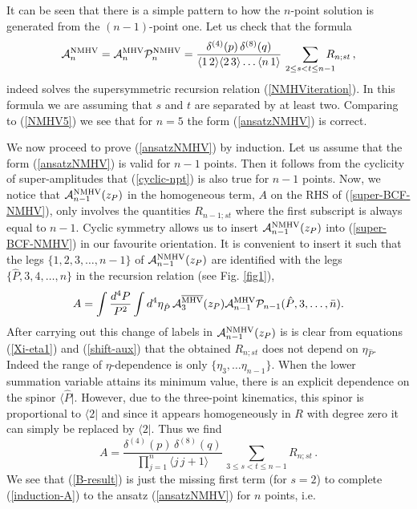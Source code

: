 \documentclass[12pt]{article}
\def \be  {\begin{equation}}
\def \ee  {\end{equation}}
\newcommand \widebar [1] {\overline{#1}}
\newcommand \vev [1] {\langle{#1}\rangle}
\def\l<{\langle}\def\r>{\rangle}
\begin{document}
It can be seen that there is a simple pattern to how the $n$-point solution is generated from the $(n-1)$-point one.
Let us check that the formula
\be\label{ansatzNMHV}
 {\cal A}^{\rm {NMHV}}_{n} = \mathcal{A}_n^{\rm MHV} \mathcal{P}_n^{\rm NMHV} =\frac{ \delta^{(4)}(p) \, \delta^{(8)}(q)}{\vev{1\, 2}\vev{2\, 3}\ldots\vev{n\, 1}} \, \sum_{2\leq s<t  \leq n-1} \!\!\!\!\!\! R_{n;st} \,,
\ee
indeed solves the supersymmetric recursion relation (\ref{NMHViteration}). In this formula we are assuming that $s$ and $t$ are separated by at least two. Comparing to (\ref{NMHV5}) we see that for $n=5$ the form (\ref{ansatzNMHV})
is correct.

We now proceed to prove (\ref{ansatzNMHV}) by induction.
Let us assume that the form (\ref{ansatzNMHV}) is valid for $n-1$ points.
Then it follows from the cyclicity of super-amplitudes that (\ref{cyclic-npt}) is also true for $n-1$ points.
Now, we notice that ${\cal A}^{\rm {NMHV}}_{n-1}(z_{P})$ in the homogeneous term, $A$ on the RHS of (\ref{super-BCF-NMHV}), only involves the quantities $R_{n-1;st}$ where
the first subscript is always equal to $n-1$.
Cyclic symmetry allows us
to insert ${\cal A}^{\rm {NMHV}}_{n-1}(z_{P})$ into (\ref{super-BCF-NMHV}) in our favourite
orientation. It is convenient to insert it such that the legs $\{ 1,2,3,\ldots,n-1\}$ of
${\cal A}^{\rm {NMHV}}_{n-1}(z_{P})$ are identified with the legs $\{ \hat{P},3,4,\ldots,n\}$ in the recursion
relation (see Fig. \ref{fig1}),
\be
A = \int
\frac{d^{4}P}{P^2} \int d^{4} \eta_{\hat{P}} \,
\mathcal{A}_{3}^{\rm \widebar{MHV}}(z_{P}) \mathcal{A}_{n-1}^{\rm
MHV} \mathcal{P}_{n-1}(\hat{P},3,\ldots,\bar{n}).
\ee
After carrying out this change of labels in ${\cal A}^{\rm {NMHV}}_{n-1}(z_{P})$ is is clear from equations (\ref{Xi-eta1}) and (\ref{shift-aux})
that the obtained $R_{n;st}$ does not depend on $\eta_{\hat{P}}$. Indeed the range of $\eta$-dependence is only $\{\eta_3,\ldots \eta_{n-1}\}$. When the lower summation variable attains its minimum value, there is an explicit dependence on the spinor $\l<\hat P|$. However, due to the three-point kinematics, this spinor is proportional to $\l< 2|$ and since it appears homogeneously in $R$ with degree zero it can simply be replaced by $\l<2|$. Thus we find
\be\label{induction-A} A = \frac{
\delta^{(4)}(p) \, \delta^{(8)}(q)}{\prod_{j=1}^{n} \langle j \,
j+1 \rangle } \, \sum_{3 \leq s<t \leq n-1} \!\!\!\!\!\! R_{n;st} \,. \ee
We see
that (\ref{B-result}) is just the missing first term (for $s=2$)
to complete (\ref{induction-A}) to the ansatz (\ref{ansatzNMHV})
for $n$ points, i.e.
\end{document}
